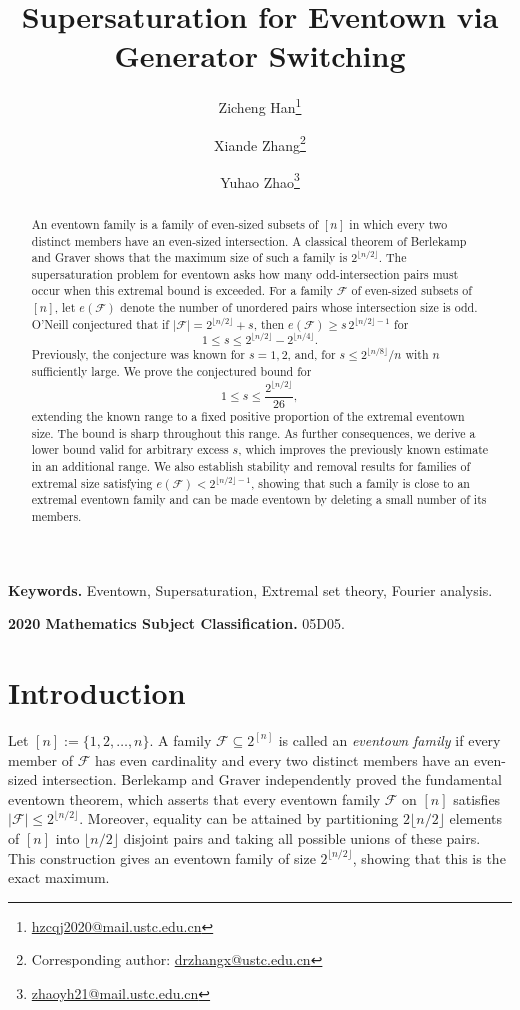 \documentclass[11pt]{article}
\title{Supersaturation for Eventown via Generator Switching}
\author[1]{Zicheng Han\thanks{
\href{mailto:hzcqj2020@mail.ustc.edu.cn}{hzcqj2020@mail.ustc.edu.cn}}}
\author[1,2]{Xiande Zhang\thanks{
Corresponding author: \href{mailto:drzhangx@ustc.edu.cn}{drzhangx@ustc.edu.cn}}}
\author[1]{Yuhao Zhao\thanks{
\href{mailto:zhaoyh21@mail.ustc.edu.cn}{zhaoyh21@mail.ustc.edu.cn}}}
\affil[1]{School of Mathematical Sciences, University of Science and Technology of China, Hefei 230026, China}
\affil[2]{Hefei National Laboratory, University of Science and Technology of China, Hefei 230088, China}
\date{}
\begin{document}
\maketitle


\begin{abstract}
An eventown family is a family of even-sized subsets of $[n]$ in which every two distinct members have an even-sized intersection. A classical theorem of Berlekamp and Graver shows that the maximum size of such a family is $2^{\lfloor n/2\rfloor}$. The supersaturation problem for eventown asks how many odd-intersection pairs must occur when this extremal bound is exceeded. For a family $\mathcal F$ of even-sized subsets of $[n]$, let
$e(\mathcal F)$ denote the number of unordered pairs whose intersection size is odd. O'Neill conjectured that if
$|\mathcal F|=2^{\lfloor n/2\rfloor}+s$, then $e(\mathcal F)\ge s\,2^{\lfloor n/2\rfloor-1}$
for
\[
1\le s\le
2^{\lfloor n/2\rfloor}-2^{\lfloor n/4\rfloor}.
\]
Previously, the conjecture was known for $s=1,2$, and, for $s\le 2^{\lfloor n/8\rfloor}/n$ with $n$ sufficiently large. We prove the conjectured bound for
\[
1\le s\le \frac{2^{\lfloor n/2\rfloor}}{26},
\]
extending the known range to a fixed positive proportion of the extremal eventown size. The bound is sharp throughout this range. As further consequences, we derive a lower bound valid for
arbitrary excess $s$, which improves the previously known estimate in an
additional range. We also establish stability and removal results for
families of extremal size satisfying
$e(\mathcal F)<2^{\lfloor n/2\rfloor-1}$, showing that such a family is close to an extremal eventown family and can be made eventown by deleting a small number
of its members.
\end{abstract}


\medskip
\noindent\textbf{Keywords.}
Eventown, Supersaturation, Extremal set theory, Fourier analysis.

\medskip
\noindent\textbf{2020 Mathematics Subject Classification.}
05D05.

\section{Introduction}
Let \([n]:=\{1,2,\ldots,n\}\). A family \(\mathcal F\subseteq 2^{[n]}\) is
called an \emph{eventown family} if every member of \(\mathcal F\) has even cardinality and every two distinct members have an even-sized intersection.
Berlekamp \cite{Berlekamp} and Graver \cite{Graver} independently proved the fundamental eventown theorem, which asserts that every eventown family \(\mathcal F\) on \([n]\) satisfies \(|\mathcal F|\le 2^{\lfloor n/2\rfloor}\). Moreover, equality can be attained by partitioning \(2\lfloor n/2\rfloor\) elements of \([n]\) into \(\lfloor n/2\rfloor\) disjoint pairs and taking all possible unions of these pairs. This construction gives an eventown family of size \(2^{\lfloor n/2\rfloor}\), showing that this is the exact maximum.  
\end{document}
